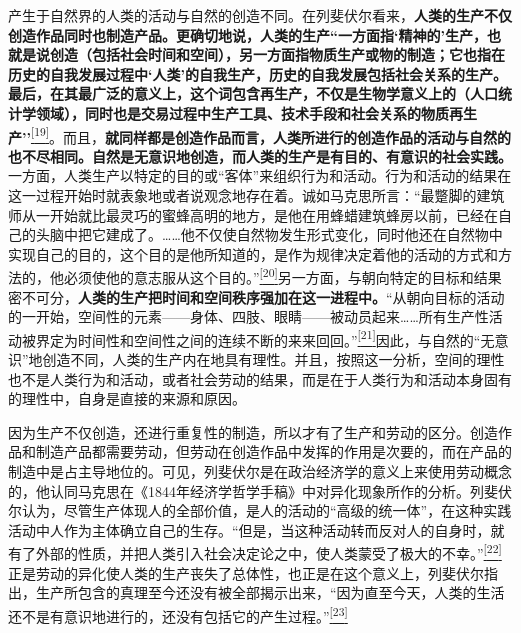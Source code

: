 \documentclass[UTF8, fontset = sourcesans, a4paper, oneside, zihao =
-4, scheme=chinese, no-math, space=true]{ctexbook}
\begin{document}
产生于自然界的人类的活动与自然的创造不同。在列斐伏尔看来，\textbf{人类的生产不仅创造作品同时也制造产品。更确切地说，人类的生产``一方面指`精神的'生产，也就是说创造（包括社会时间和空间），另一方面指物质生产或物的制造；它也指在历史的自我发展过程中`人类'的自我生产，历史的自我发展包括社会关系的生产。最后，在其最广泛的意义上，这个词包含再生产，不仅是生物学意义上的（人口统计学领域），同时也是交易过程中生产工具、技术手段和社会关系的物质再生产''}\protect\hypertarget{part0006_split_002.htmlux5cux23w19}{}{}\protect\hyperlink{part0006_split_003.htmlux5cux23m19}{\textsuperscript{{[}19{]}}}。而且，\textbf{就同样都是创造作品而言，人类所进行的创造作品的活动与自然的也不尽相同。自然是无意识地创造，而人类的生产是有目的、有意识的社会实践。}一方面，人类生产以特定的目的或``客体''来组织行为和活动。行为和活动的结果在这一过程开始时就表象地或者说观念地存在着。诚如马克思所言：``最蹩脚的建筑师从一开始就比最灵巧的蜜蜂高明的地方，是他在用蜂蜡建筑蜂房以前，已经在自己的头脑中把它建成了。……他不仅使自然物发生形式变化，同时他还在自然物中实现自己的目的，这个目的是他所知道的，是作为规律决定着他的活动的方式和方法的，他必须使他的意志服从这个目的。''\protect\hypertarget{part0006_split_002.htmlux5cux23w20}{}{}\protect\hyperlink{part0006_split_003.htmlux5cux23m20}{\textsuperscript{{[}20{]}}}另一方面，与朝向特定的目标和结果密不可分，\textbf{人类的生产把时间和空间秩序强加在这一进程中。}``从朝向目标的活动的一开始，空间性的元素------身体、四肢、眼睛------被动员起来……所有生产性活动被界定为时间性和空间性之间的连续不断的来来回回。''\protect\hypertarget{part0006_split_002.htmlux5cux23w21}{}{}\protect\hyperlink{part0006_split_003.htmlux5cux23m21}{\textsuperscript{{[}21{]}}}因此，与自然的``无意识''地创造不同，人类的生产内在地具有理性。并且，按照这一分析，空间的理性也不是人类行为和活动，或者社会劳动的结果，而是在于人类行为和活动本身固有的理性中，自身是直接的来源和原因。

因为生产不仅创造，还进行重复性的制造，所以才有了生产和劳动的区分。创造作品和制造产品都需要劳动，但劳动在创造作品中发挥的作用是次要的，而在产品的制造中是占主导地位的。可见，列斐伏尔是在政治经济学的意义上来使用劳动概念的，他认同马克思在《1844年经济学哲学手稿》中对异化现象所作的分析。列斐伏尔认为，尽管生产体现人的全部价值，是人的活动的``高级的统一体''，在这种实践活动中人作为主体确立自己的生存。``但是，当这种活动转而反对人的自身时，就有了外部的性质，并把人类引入社会决定论之中，使人类蒙受了极大的不幸。''\protect\hypertarget{part0006_split_002.htmlux5cux23w22}{}{}\protect\hyperlink{part0006_split_003.htmlux5cux23m22}{\textsuperscript{{[}22{]}}}正是劳动的异化使人类的生产丧失了总体性，也正是在这个意义上，列斐伏尔指出，生产所包含的真理至今还没有被全部揭示出来，``因为直至今天，人类的生活还不是有意识地进行的，还没有包括它的产生过程。''\protect\hypertarget{part0006_split_002.htmlux5cux23w23}{}{}\protect\hyperlink{part0006_split_003.htmlux5cux23m23}{\textsuperscript{{[}23{]}}}
\end{document}
